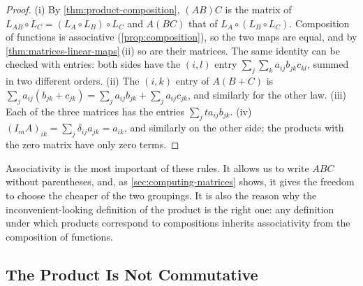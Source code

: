 \begin{proof}
(i) By \cref{thm:product-composition}, $(AB)C$ is the matrix of $L_{AB}\circ L_C=(L_A\circ L_B)\circ L_C$ and $A(BC)$ that of $L_A\circ(L_B\circ L_C)$. Composition of functions is associative (\cref{prop:composition}), so the two maps are equal, and by \cref{thm:matrices-linear-maps}\,(ii) so are their matrices. The same identity can be checked with entries: both sides have the $(i,l)$ entry $\sum_j\sum_ka_{ij}b_{jk}c_{kl}$, summed in two different orders. (ii) The $(i,k)$ entry of $A(B+C)$ is $\sum_ja_{ij}(b_{jk}+c_{jk})=\sum_ja_{ij}b_{jk}+\sum_ja_{ij}c_{jk}$, and similarly for the other law. (iii) Each of the three matrices has the entries $\sum_jta_{ij}b_{jk}$. (iv) $(I_mA)_{ik}=\sum_j\delta_{ij}a_{jk}=a_{ik}$, and similarly on the other side; the products with the zero matrix have only zero terms.
\end{proof}

Associativity is the most important of these rules. It allows us to write $ABC$ without parentheses, and, as \cref{sec:computing-matrices} shows, it gives the freedom to choose the cheaper of the two groupings. It is also the reason why the inconvenient-looking definition of the product is the right one: any definition under which products correspond to compositions inherits associativity from the composition of functions.

\subsection{The Product Is Not Commutative}

